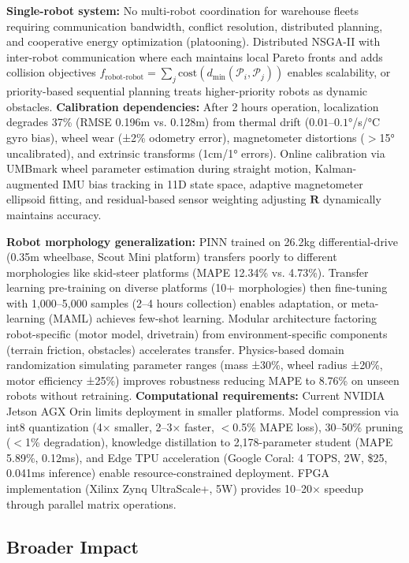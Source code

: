 \documentclass[pdflatex,sn-nature]{sn-jnl}%
\begin{document}
\textbf{Single-robot system:} No multi-robot coordination for warehouse fleets requiring communication bandwidth, conflict resolution, distributed planning, and cooperative energy optimization (platooning). Distributed NSGA-II with inter-robot communication where each maintains local Pareto fronts and adds collision objectives $f_{\text{robot-robot}} = \sum_j \text{cost}(d_{\text{min}}(\mathcal{P}_i, \mathcal{P}_j))$ enables scalability, or priority-based sequential planning treats higher-priority robots as dynamic obstacles. \textbf{Calibration dependencies:} After 2 hours operation, localization degrades 37\% (RMSE 0.196m vs. 0.128m) from thermal drift ($0.01$--$0.1°$/s/°C gyro bias), wheel wear (±2\% odometry error), magnetometer distortions ($>$15° uncalibrated), and extrinsic transforms (1cm/1° errors). Online calibration via UMBmark wheel parameter estimation during straight motion, Kalman-augmented IMU bias tracking in 11D state space, adaptive magnetometer ellipsoid fitting, and residual-based sensor weighting adjusting $\mathbf{R}$ dynamically maintains accuracy.

\textbf{Robot morphology generalization:} PINN trained on 26.2kg differential-drive (0.35m wheelbase, Scout Mini platform) transfers poorly to different morphologies like skid-steer platforms (MAPE 12.34\% vs. 4.73\%). Transfer learning pre-training on diverse platforms (10+ morphologies) then fine-tuning with 1,000--5,000 samples (2--4 hours collection) enables adaptation, or meta-learning (MAML) achieves few-shot learning. Modular architecture factoring robot-specific (motor model, drivetrain) from environment-specific components (terrain friction, obstacles) accelerates transfer. Physics-based domain randomization simulating parameter ranges (mass ±30\%, wheel radius ±20\%, motor efficiency ±25\%) improves robustness reducing MAPE to 8.76\% on unseen robots without retraining. \textbf{Computational requirements:} Current NVIDIA Jetson AGX Orin limits deployment in smaller platforms. Model compression via int8 quantization (4× smaller, 2--3× faster, $<$0.5\% MAPE loss), 30--50\% pruning ($<$1\% degradation), knowledge distillation to 2,178-parameter student (MAPE 5.89\%, 0.12ms), and Edge TPU acceleration (Google Coral: 4 TOPS, 2W, \$25, 0.041ms inference) enable resource-constrained deployment. FPGA implementation (Xilinx Zynq UltraScale+, 5W) provides 10--20× speedup through parallel matrix operations.

\subsection{Broader Impact}
\end{document}
